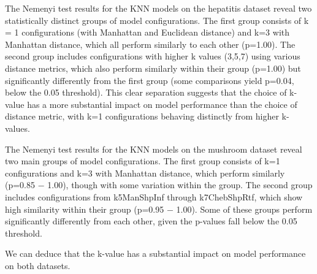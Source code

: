 The Nemenyi test results for the KNN models on the hepatitis dataset reveal two statistically distinct
groups of model configurations. The first group consists of k = 1 configurations
(with Manhattan and Euclidean distance) and k=3 with Manhattan distance, which all perform similarly to each other (p=1.00).
The second group includes configurations with higher k values (3,5,7) using various distance metrics,
which also perform similarly within their group (p=1.00) but significantly differently from the first
group (some comparisons yield p=0.04, below the 0.05 threshold). This clear separation suggests that the choice of k-value
has a more substantial impact on model performance than the choice of distance metric, with k=1 configurations behaving distinctly from higher k-values.

The Nemenyi test results for the KNN models on the mushroom dataset reveal two main groups of model configurations.
The first group consists of k=1 configurations and k=3 with Manhattan distance, which perform similarly
(p=0.85 $-$ 1.00), though with some variation within the group. The second group includes configurations
from k5ManShpInf through k7ChebShpRtf, which show high similarity within their group (p=0.95 $-$ 1.00).
Some of these groups perform significantly differently from each other, given the p-values fall below the 0.05 threshold.

We can deduce that the k-value has a substantial impact on model performance on both datasets. 




